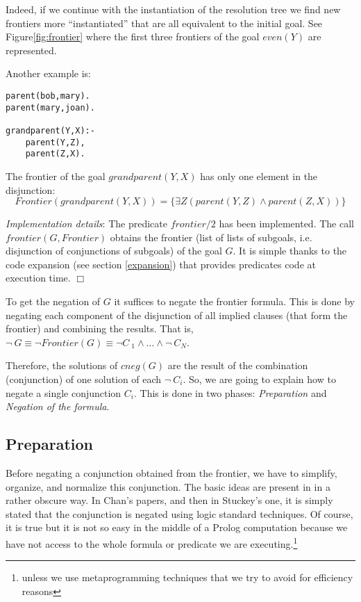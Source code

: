 \documentclass{tlp}
\begin{document}
Indeed, if we continue with the instantiation of the resolution tree we find
new frontiers more ``instantiated'' that are all equivalent to the initial
goal. See Figure\ref{fig:frontier} where the first three frontiers of the goal
$even(Y)$ are represented.

Another example is:
{\small
\begin{verbatim}
parent(bob,mary).
parent(mary,joan).

grandparent(Y,X):- 
    parent(Y,Z),
    parent(Z,X).
\end{verbatim}
}

The frontier of the goal $grandparent (Y,X)$ has only one element in the
disjunction:
\[Frontier(grandparent(Y,X)) = \{ \exists Z (parent(Y,Z) \wedge parent(Z,X) ) \} \] 


\noindent
\emph{Implementation details}: The predicate $frontier/2$ has been
implemented. The call $frontier(G,Frontier)$ obtains the frontier (list of
lists of subgoals, i.e. disjunction of conjunctions of subgoals) of the goal
$G$. It is simple thanks to the code expansion (see section \ref{expansion})
that provides predicates code at execution time. $\Box$

To get the negation of $G$ it suffices to negate the frontier
formula. This is done by negating each component of the disjunction of
all implied clauses (that form the frontier) and combining the
results. That is, $\neg ~ G \equiv \neg Frontier(G) \equiv \neg C~ _1
\wedge \ldots \wedge \neg~  C_N$.

Therefore, the solutions of $cneg(G)$ are the result of the
combination (conjunction) of one solution of each $\neg ~ C_i$. So, we
are going to explain how to negate a single conjunction $C_i$. This is
done in two phases: \emph{Preparation} and \emph{Negation of the
formula}.



\vspace{-0.1in}

\subsection{Preparation}
\label{preparation}


Before negating a conjunction obtained from the frontier, we have to
simplify, organize, and normalize this conjunction. The basic ideas are
present in \cite{Chan1} in a rather obscure way. In Chan's papers,
and then in Stuckey's one, it is simply stated that the conjunction is negated
using logic standard techniques. Of course, it is true but it is not so
easy in the middle of a Prolog computation because we have not
access to the whole formula or predicate we are executing.\footnote{unless 
we use metaprogramming techniques that we try to avoid for efficiency reasons}
\end{document}
